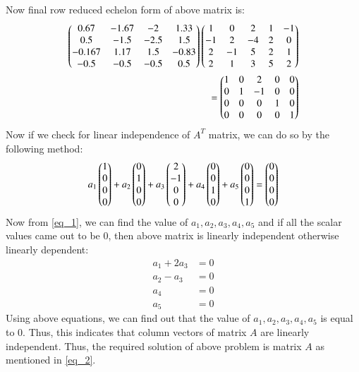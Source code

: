 \documentclass[journal,12pt,twocolumn]{IEEEtran}
\begin{document}
Now final row reduced echelon form of above matrix is:
\begin{align}\nonumber
    \begin{pmatrix}0.67 & -1.67 & -2 & 1.33\\
           0.5 & -1.5 & -2.5 & 1.5\\
           -0.167 & 1.17 & 1.5 & -0.83\\
           -0.5 & -0.5 & -0.5 & 0.5\end{pmatrix} 
    \begin{pmatrix}1 & 0 & 2 & 1 & -1 \\
           -1 & 2 & -4 & 2 & 0 \\
           2 & -1 & 5 & 2 & 1 \\
           2 & 1 & 3 & 5 & 2\end{pmatrix} \\ 
    = \begin{pmatrix}1 & 0 & 2 & 0 & 0 \\
           0 & 1 & -1 & 0 & 0 \\
           0 & 0 & 0 & 1 & 0 \\
           0 & 0 & 0 & 0 & 1\end{pmatrix}
\end{align}
Now if we check for linear independence of $A^T$ matrix, we can do so by the following method:
\begin{align}
    a_1\begin{pmatrix}1\\0\\0\\0\end{pmatrix} + a_2\begin{pmatrix}0\\1\\0\\0\end{pmatrix} + a_3\begin{pmatrix}2\\-1\\0\\0\end{pmatrix} + a_4\begin{pmatrix}0\\0\\1\\0\end{pmatrix} + a_5\begin{pmatrix}0\\0\\0\\1\end{pmatrix} = \begin{pmatrix}0\\0\\0\\0\end{pmatrix} \label{eq_1}
\end{align}
Now from \eqref{eq_1}, we can find the value of $a_1,a_2,a_3,a_4,a_5$ and if all the scalar values came out to be 0, then above matrix is linearly independent otherwise linearly dependent:
\begin{align}
    a_1+2a_3 &= 0 \\
    a_2-a_3 &= 0 \\
    a_4 &= 0 \\
    a_5 &= 0
\end{align}
Using above equations, we can find out that the value of $a_1,a_2,a_3,a_4,a_5$ is equal to 0. Thus, this indicates that column vectors of matrix $A$ are linearly independent. Thus, the required solution of above problem is matrix $A$ as mentioned in \eqref{eq_2}.
\end{document}
